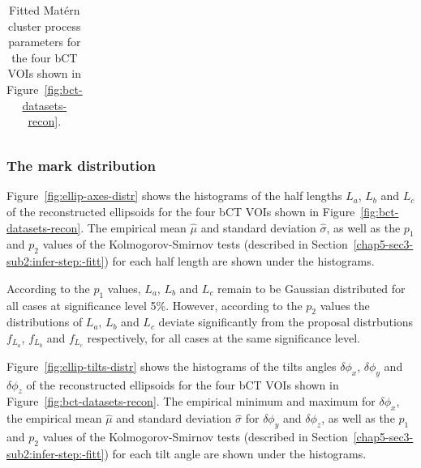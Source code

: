 \documentclass[journal]{IEEEtran}
\begin{document}
\begin{table}[!htb]
\begin{center}
\begin{tabular}{ m{1.3cm} m{1.5cm} m{1.5cm} m{1.5cm} }
      \centering{\# 11}
      & \centering{3.405e-03}
      & \centering{1.923e-02}
      & \centering{3.853}
        \tabularnewline%



      \bottomrule

    \end{tabular}
    \caption{Fitted Mat\'ern cluster process parameters for the four
      bCT VOIs shown in Figure~\ref{fig:bct-datasets-recon}.}
    \label{tab:matern-fit-params}
  \end{center}
\end{table}

\subsubsection*{The mark distribution}
\label{chap4-sec4-sub2sub2:distr-semi-princ}

Figure~\ref{fig:ellip-axes-distr} shows the histograms of the half
lengths $L_a$, $L_b$ and $L_c$ of the reconstructed ellipsoids for the
four bCT VOIs shown in Figure~\ref{fig:bct-datasets-recon}. The
empirical mean $\hat{\mu}$ and standard deviation $\hat{\sigma}$, as
well as the $p_1$ and $p_2$ values of the Kolmogorov-Smirnov tests
(described in Section~\ref{chap5-sec3-sub2:infer-step:-fitt}) for each
half length are shown under the histograms.

According to the $p_1$ values, $L_a$, $L_b$ and $L_c$ remain to be
Gaussian distributed for all cases at significance level 5\%. However,
according to the $p_2$ values the distributions of $L_a$, $L_b$ and
$L_c$ deviate significantly from the proposal distrbutions $f_{L_a}$,
$f_{L_b}$ and $f_{L_c}$ respectively, for all cases at the same
significance level.

Figure~\ref{fig:ellip-tilts-distr} shows the histograms of the tilts
angles $\delta\phi_x$, $\delta\phi_y$ and $\delta\phi_z$ of the
reconstructed ellipsoids for the four bCT VOIs shown in
Figure~\ref{fig:bct-datasets-recon}. The empirical minimum and maximum
for $\delta\phi_x$, the empirical mean $\hat{\mu}$ and standard
deviation $\hat{\sigma}$ for $\delta\phi_y$ and $\delta\phi_z$, as
well as the $p_1$ and $p_2$ values of the Kolmogorov-Smirnov tests
(described in Section~\ref{chap5-sec3-sub2:infer-step:-fitt}) for each
tilt angle are shown under the histograms.
\end{document}
